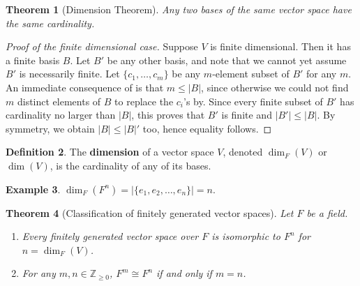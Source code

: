\documentclass[12pt]{report}
\newtheorem{theorem}{Theorem}[chapter]
\numberwithin{equation}{section}
\numberwithin{theorem}{chapter}
\theoremstyle{definition}
\newtheorem{definition}[theorem]{Definition}
\newtheorem{example}[theorem]{Example}
\newtheorem*{basic properties}{Basic Properties}
\newtheorem*{Important Remark}{Important Remark}
\newcommand{\df}[1]{{\bf #1}\index{#1}}
\begin{document}
\begin{theorem}[Dimension Theorem]\label{thm1116a}
Any two bases of the same vector space have the same cardinality.
\end{theorem}


\begin{proof}[Proof of the finite dimensional case]
Suppose $V$ is finite dimensional. Then it has a finite basis $B$. Let $B'$ be any other basis, and note that we cannot yet assume $B'$ is necessarily finite. Let $\{c_1, \dots, c_m\}$ be any $m$-element subset of $B'$ for any $m$. An immediate consequence of  is that $m \leqslant |B|$, since otherwise we could not find $m$ distinct elements of $B$ to replace the $c_i$'s by. 
Since every finite subset of $B'$ has cardinality no larger than $|B|$, this proves that $B'$ is finite and $|B'| \leqslant |B|$. By symmetry, we obtain $|B| \leqslant |B|'$ too, hence equality follows.
\end{proof}


\begin{definition}
 The \df{dimension} of a vector space $V$, denoted $\dim_F(V)$ or $\dim(V)$, is the cardinality of any of its bases.
 \end{definition}
 
 \begin{example}
 $\dim_F(F^n) = |\{e_1,e_2,\ldots,e_n\}| = n.$
 \end{example}
 



 
\begin{theorem}[Classification of finitely generated vector spaces]\label{classification of fg vector spaces}
 Let $F$ be a field. 
\begin{enumerate}[label=(\arabic*),itemsep=0mm]
\item Every finitely generated vector space over $F$ is isomorphic to $F^n$ for $n=\dim_F(V)$. 
\item For any $m,n \in \mathbb{Z}_{\geqslant 0}$,  $F^m \cong F^n$ if and only if $m = n$.
\end{enumerate}
\end{theorem}
\end{document}
